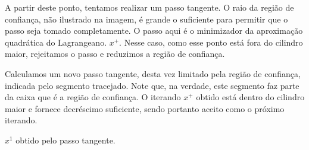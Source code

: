 \begin{center}
\end{center}

\begin{center}
  \begin{minipage}{0.9\textwidth}
  A partir deste ponto, tentamos realizar um passo tangente. O raio da região de
  confiança, não ilustrado na imagem, é grande o suficiente para permitir que o
  passo seja tomado completamente. O passo aqui é o minimizador da aproximação
  quadrática do Lagrangeano. $x^+$. Nesse caso, como esse ponto está fora do
  cilindro maior, rejeitamos o passo e reduzimos a
  região de confiança.
\end{minipage}
\end{center}

\begin{center}
\end{center}

\begin{center}
  \begin{minipage}{0.9\textwidth}
  Calculamos um novo passo tangente, desta vez limitado pela região de
  confiança, indicada pelo segmento tracejado. Note que, na verdade, este
  segmento faz parte da caixa que é a região de confiança.
  O iterando $x^+$ obtido está dentro do cilindro maior e fornece decréscimo
  suficiente, sendo portanto aceito como o próximo iterando.
\end{minipage}
\end{center}

\begin{center}
\end{center}

\begin{center}
  \begin{minipage}{0.9\textwidth}
  $x^1$ obtido pelo passo tangente.
\end{minipage}
\end{center}
